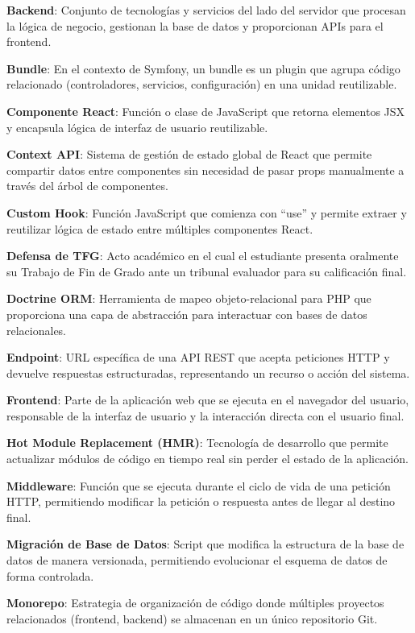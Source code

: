 \documentclass[12pt,a4paper,oneside]{report}
\begin{document}
\textbf{Backend}: Conjunto de tecnologías y servicios del lado del
servidor que procesan la lógica de negocio, gestionan la base de datos y
proporcionan APIs para el frontend.

\textbf{Bundle}: En el contexto de Symfony, un bundle es un plugin que
agrupa código relacionado (controladores, servicios, configuración) en
una unidad reutilizable.

\textbf{Componente React}: Función o clase de JavaScript que retorna
elementos JSX y encapsula lógica de interfaz de usuario reutilizable.

\textbf{Context API}: Sistema de gestión de estado global de React que
permite compartir datos entre componentes sin necesidad de pasar props
manualmente a través del árbol de componentes.

\textbf{Custom Hook}: Función JavaScript que comienza con ``use'' y
permite extraer y reutilizar lógica de estado entre múltiples
componentes React.

\textbf{Defensa de TFG}: Acto académico en el cual el estudiante
presenta oralmente su Trabajo de Fin de Grado ante un tribunal evaluador
para su calificación final.

\textbf{Doctrine ORM}: Herramienta de mapeo objeto-relacional para PHP
que proporciona una capa de abstracción para interactuar con bases de
datos relacionales.

\textbf{Endpoint}: URL específica de una API REST que acepta peticiones
HTTP y devuelve respuestas estructuradas, representando un recurso o
acción del sistema.

\textbf{Frontend}: Parte de la aplicación web que se ejecuta en el
navegador del usuario, responsable de la interfaz de usuario y la
interacción directa con el usuario final.

\textbf{Hot Module Replacement (HMR)}: Tecnología de desarrollo que
permite actualizar módulos de código en tiempo real sin perder el estado
de la aplicación.

\textbf{Middleware}: Función que se ejecuta durante el ciclo de vida de
una petición HTTP, permitiendo modificar la petición o respuesta antes
de llegar al destino final.

\textbf{Migración de Base de Datos}: Script que modifica la estructura
de la base de datos de manera versionada, permitiendo evolucionar el
esquema de datos de forma controlada.

\textbf{Monorepo}: Estrategia de organización de código donde múltiples
proyectos relacionados (frontend, backend) se almacenan en un único
repositorio Git.
\end{document}
